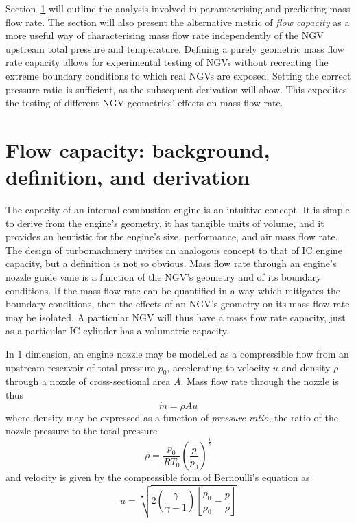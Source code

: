 \documentclass[a4paper, 11pt, oneside]{report}
\begin{document}
Section~\ref{flow_capacity_background_definition_and_derivation} will outline the analysis involved in parameterising and predicting mass flow rate. The section will also present the alternative metric of \textit{flow capacity} as a more useful way of characterising mass flow rate independently of the NGV upstream total pressure and temperature. Defining a purely geometric mass flow rate capacity allows for experimental testing of NGVs without recreating the extreme boundary conditions to which real NGVs are exposed. Setting the correct pressure ratio is sufficient, as the subsequent derivation will show. This expedites the testing of different NGV geometries' effects on mass flow rate.

\section{Flow capacity: background, definition, and derivation}
\label{flow_capacity_background_definition_and_derivation}

The capacity of an internal combustion engine is an intuitive concept. It is simple to derive from the engine's geometry, it has tangible units of volume, and it provides an heuristic for the engine's size, performance, and air mass flow rate. The design of turbomachinery invites an analogous concept to that of IC engine capacity, but a definition is not so obvious. Mass flow rate through an engine's nozzle guide vane is a function of the NGV's geometry and of its boundary conditions. If the mass flow rate can be quantified in a way which mitigates the boundary conditions, then the effects of an NGV's geometry on its mass flow rate may be isolated. A particular NGV will thus have a mass flow rate capacity, just as a particular IC cylinder has a volumetric capacity.

In 1 dimension, an engine nozzle may be modelled as a compressible flow from an upstream reservoir of total pressure $p_0$, accelerating to velocity $u$ and density $\rho$ through a nozzle of cross-sectional area $A$. Mass flow rate through the nozzle is thus
\begin{equation}
\dot{m} = \rho A u
\end{equation}
where density may be expressed as a function of \textit{pressure ratio}, the ratio of the nozzle pressure to the total pressure
\begin{equation}
\rho = \frac{p_0}{R T_0} \left(\frac{p}{p_0}\right)^\frac{1}{\gamma}
\end{equation}
and velocity is given by the compressible form of Bernoulli's equation as
\begin{equation}\label{compressible_bernouilli}
u =
\sqrt[•]{ 
	2 \left( \frac{\gamma}{\gamma - 1} \right) \left[ \frac{p_0}{\rho_0} - \frac{p}{\rho} \right] 
}
\end{equation}
\end{document}
